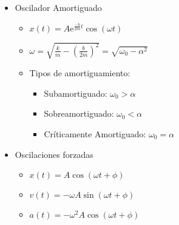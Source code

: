 \documentclass[12pt,a4paper]{article}
\begin{document}
\begin{itemize}
\begin{multicols}{2}
\begin{itemize}
\[							\]
					\end{itemize}
				\end{multicols}
			\item Oscilador Amortiguado
				\begin{multicols}{2}
					\begin{itemize}
						\item $x(t) = A \mathrm{e}^{\frac{-b}{2m}t} \cos (\omega t)$
						\item $\omega = \sqrt{\frac{k}{m} - \left(\frac{b}{2m}\right)^{2}} = \sqrt{\omega_{0} - \alpha^{2}}$
						\item Tipos de amortiguamiento:
						\begin{itemize}
							\item Subamortiguado: $\omega_{0} > \alpha$
							\item Sobreamortiguado: $\omega_{0} < \alpha$
							\item Críticamente Amortiguado: $\omega_{0} = \alpha$
						\end{itemize}
					\end{itemize}
				\end{multicols}
			\item Oscilaciones forzadas
				\begin{multicols}{3}
					\begin{itemize}
						\item $x(t) = A \cos (\omega t + \phi)$
						\item $v(t) = - \omega A \sin (\omega t + \phi)$
						\item $a(t) = - \omega^{2} A \cos (\omega t + \phi)$
					\end{itemize}
				\end{multicols}
		\end{itemize}
\end{document}
